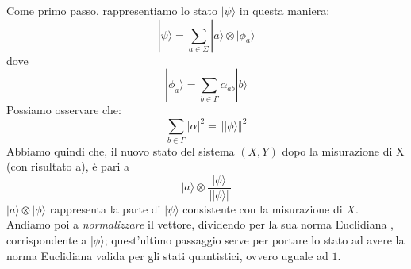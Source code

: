 Come primo passo, rappresentiamo lo stato $|\psi\rangle$ in questa maniera:
\begin{equation*}
    |\psi \rangle = \sum_{a \in \Sigma} |a\rangle \otimes |\phi_a\rangle
\end{equation*}
dove
\begin{equation*}
    |\phi_a\rangle = \sum_{b \in \Gamma} \alpha_{ab} |b\rangle
\end{equation*}
Possiamo osservare che:
\begin{equation*}
    \sum_{b \in \Gamma} |\alpha|^2 ={ \Vert |\phi\rangle \Vert }^2
\end{equation*}
Abbiamo quindi che, il nuovo stato del sistema $(X,Y)$ dopo la misurazione di X (con risultato a), è pari a
\begin{equation*}
    |a\rangle \otimes \frac{|\phi\rangle}{\Vert |\phi\rangle \Vert }
\end{equation*}
$|a\rangle \otimes |\phi\rangle$ rappresenta la parte di $|\psi\rangle$ consistente con la misurazione di $X$. Andiamo poi a \textit{normalizzare} il vettore, dividendo per la sua norma Euclidiana , corrispondente a $|\phi\rangle$; quest'ultimo passaggio serve per portare lo stato ad avere la norma Euclidiana valida per gli stati quantistici, ovvero uguale ad $1$.
